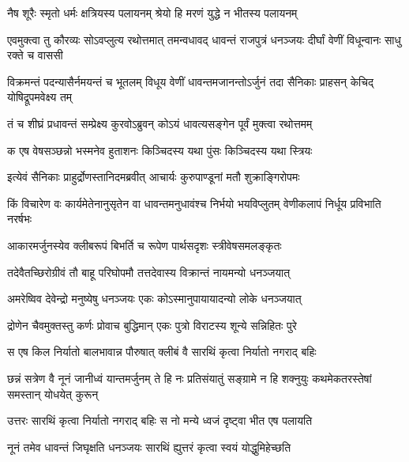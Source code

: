 


\twolineshloka
{नैष शूरैः स्मृतो धर्मः क्षत्रियस्य पलायनम्}
{श्रेयो हि मरणं युद्धे न भीतस्य पलायनम्}



\threelineshloka
{एवमुक्त्वा तु कौरव्यः सोऽवप्लुत्य रथोत्तमात्}
{तमन्वधावद् धावन्तं राजपुत्रं धनञ्जयः}
{दीर्घां वेणीं विधून्वानः साधु रक्ते च वाससी}


\threelineshloka
{विक्रमन्तं पदन्यासैर्नमयन्तं च भूतलम्}
{विधूय वेणीं धावन्तमजानन्तोऽर्जुनं तदा}
{सैनिकाः प्राहसन् केचिद् योषिद्रूपमवेक्ष्य तम्}


\twolineshloka
{तं च शीघ्रं प्रधावन्तं सम्प्रेक्ष्य कुरवोऽब्रुवन्}
{कोऽयं धावत्यसङ्गेन पूर्वं मुक्त्वा रथोत्तमम्}


\twolineshloka
{क एष वेषसञ्छन्नो भस्मनेव हुताशनः}
{किञ्चिदस्य यथा पुंसः किञ्चिदस्य यथा स्त्रियः}


\twolineshloka
{इत्येवं सैनिकाः प्राहुर्द्रोणस्तानिदमब्रवीत्}
{आचार्यः कुरुपाण्डूनां मतौ शुक्राङ्गिरोपमः}


\threelineshloka
{किं विचारेण वः कार्यमेतेनानुसृतेन वा}
{धावन्तमनुधावंश्च निर्भयो भयविप्लुतम्}
{वेणीकलापं निर्धूय प्रविभाति नरर्षभः}


\twolineshloka
{आकारमर्जुनस्येव क्लीबरूपं बिभर्ति च}
{रूपेण पार्थसदृशः स्त्रीवेषसमलङ्कृतः}


\twolineshloka
{तदेवैतच्छिरोग्रीवं तौ बाहू परिघोपमौ}
{तत्तदेवास्य विक्रान्तं नायमन्यो धनञ्जयात्}


\twolineshloka
{अमरेष्विव देवेन्द्रो मनुष्येषु धनञ्जयः}
{एकः कोऽस्मानुपायायादन्यो लोके धनञ्जयात्}


\twolineshloka
{द्रोणेन चैवमुक्तस्तु कर्णः प्रोवाच बुद्धिमान्}
{एकः पुत्रो विराटस्य शून्ये सन्निहितः पुरे}


\twolineshloka
{स एष किल निर्यातो बालभावान्न पौरुषात्}
{क्लीबं वै सारथिं कृत्वा निर्यातो नगराद् बहिः}


\threelineshloka
{छन्नं सत्रेण वै नूनं जानीध्वं यान्तमर्जुनम्}
{ते हि नः प्रतिसंयातुं सङ्ग्रामे न हि शक्नुयुः}
{कथमेकतरस्तेषां समस्तान् योधयेत् कुरून्}


\twolineshloka
{उत्तरः सारथिं कृत्वा निर्यातो नगराद् बहिः}
{स नो मन्ये ध्वजं दृष्ट्वा भीत एष पलायति}




\twolineshloka
{नूनं तमेव धावन्तं जिघृक्षति धनञ्जयः}
{सारथिं ह्युत्तरं कृत्वा स्वयं योद्धुमिहेच्छति}



